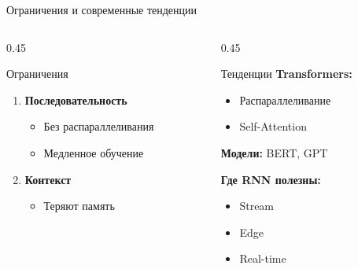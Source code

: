 \documentclass[aspectratio=169, 10pt]{beamer}
\begin{document}
\begin{frame}{Ограничения и современные тенденции}
  \begin{columns}[T]
    \begin{column}{0.45\textwidth}
      \begin{alertblock}{Ограничения}
        \scriptsize
        \begin{enumerate}
          \item \textbf{Последовательность}
            \begin{itemize}
              \item Без распараллеливания
              \item Медленное обучение
            \end{itemize}
          
          \item \textbf{Контекст}
            \begin{itemize}
              \item Теряют память
            \end{itemize}
        \end{enumerate}
      \end{alertblock}
    \end{column}
    
    \begin{column}{0.45\textwidth}
      \begin{exampleblock}{Тенденции}
        \scriptsize
        \textbf{Transformers:}
        \begin{itemize}
          \item Распараллеливание
          \item Self-Attention
        \end{itemize}
        
        \textbf{Модели:} BERT, GPT
        
        \textbf{Где RNN полезны:}
        \begin{itemize}
          \item Stream
          \item Edge
          \item Real-time
        \end{itemize}
      \end{exampleblock}
    \end{column}
  \end{columns}
\end{frame}
\end{document}

